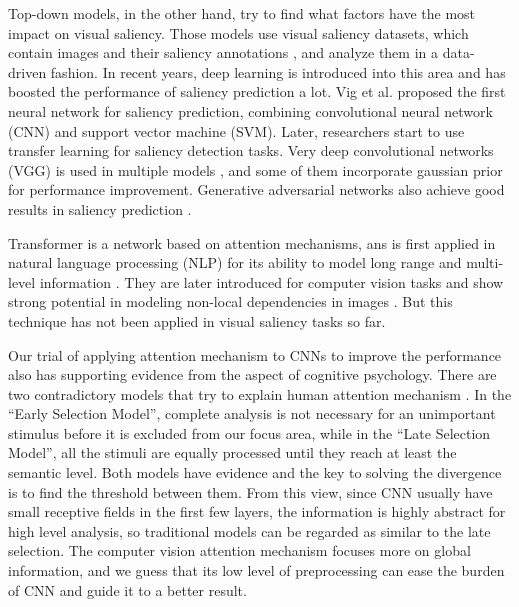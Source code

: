 \documentclass[12pt]{article}
\begin{document}
Top-down models, in the other hand, try to find what factors have the most impact on visual saliency. Those models use visual saliency datasets, which contain images and their saliency annotations
, and analyze them in a data-driven fashion.
In recent years, deep learning is introduced into this area and has boosted the performance of saliency prediction a lot.
Vig et al. \cite{vigLargeScaleOptimizationHierarchical2014} proposed the first neural network for saliency prediction, combining convolutional neural network (CNN) and support vector machine (SVM). Later, researchers start to use transfer learning for saliency 
detection tasks. Very deep convolutional networks (VGG) is used in multiple models \cite{kruthiventiDeepFixFullyConvolutional2015, kummererDeepGazeIIReading2016, corniaPredictingHumanEye2018}, and some of them incorporate gaussian prior for performance improvement.
Generative adversarial networks also achieve good results in saliency prediction \cite{panSalGANVisualSaliency2018, cheHowGazeInfluenced2020}.

Transformer is a network based on attention mechanisms, ans is first applied in natural language processing (NLP) for its ability to model long range and multi-level information \cite{bahdanauNeuralMachineTranslation2016a, vaswaniAttentionAllYou2017a}.
They are later introduced for computer vision tasks and show strong potential in modeling non-local dependencies in images \cite{zhangSelfAttentionGenerativeAdversarial2019a}.
But this technique has not been applied in visual saliency tasks so far.

Our trial of applying attention mechanism to CNNs to improve the performance also has supporting evidence from the aspect of cognitive psychology. There are two contradictory models that try to explain human attention mechanism \cite{gazzaniga2006cognitive}. 
In the “Early Selection Model”, complete analysis is not necessary for an unimportant stimulus before it is excluded from our focus area, while in the “Late Selection Model”, all the stimuli are equally processed until they reach at least the semantic level. 
Both models have evidence and the key to solving the divergence is to find the threshold between them. From this view, since CNN usually have small receptive fields in the first few layers, the information is highly abstract for high level analysis, so traditional models can be regarded as similar to the late selection. 
The computer vision attention mechanism focuses more on global information, and we guess that its low level of preprocessing can ease the burden of CNN and guide it to a better result.
\end{document}
